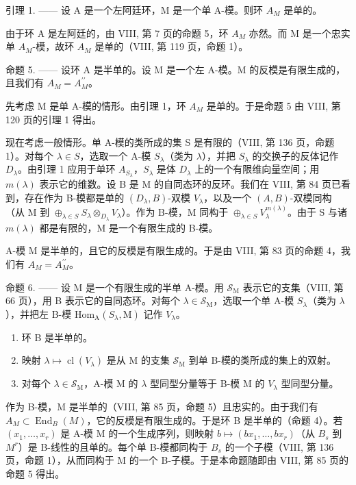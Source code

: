 引理 1. —— 设 A 是一个左阿廷环，M 是一个单 A-模。则环 \(A_{M}\) 是单的。

由于环 A 是左阿廷的，由 VIII, 第 7 页的命题 5，环 \(A_{M}\) 亦然。而 M 是一个忠实单 \(A_{M}\)-模，故环 \(A_{M}\) 是单的（VIII, 第 119 页，命题 1）。

命题 5. —— 设环 A 是半单的。设 M 是一个左 A-模。M 的反模是有限生成的，且我们有 \(A_{M} = A_{M}^{\prime\prime}\)。

先考虑 M 是单 A-模的情形。由引理 1，环 \(A_{M}\) 是单的。于是命题 5 由 VIII, 第 120 页的引理 1 得出。

现在考虑一般情形。单 A-模的类所成的集 S 是有限的（VIII, 第 136 页，命题 1）。对每个 \(\lambda \in S\)，选取一个 A-模 \(S_{\lambda}\)（类为 \(\lambda\)），并把 \(S_{\lambda}\) 的交换子的反体记作 \(D_{\lambda}\)。由引理 1 应用于单环 \(A_{S_{\lambda}}\)，\(S_{\lambda}\) 是体 \(D_{\lambda}\) 上的一个有限维向量空间；用 \(m(\lambda)\) 表示它的维数。设 B 是 M 的自同态环的反环。我们在 VIII, 第 84 页已看到，存在作为 B-模都是单的 \((D_{\lambda}, B)\)-双模 \(V_{\lambda}\)，以及一个 \((A, B)\)-双模同构（从 M 到 \(\oplus_{\lambda \in S} S_{\lambda} \otimes_{D_{\lambda}} V_{\lambda}\)）。作为 B-模，M 同构于 \(\oplus_{\lambda \in S} V_{\lambda}^{m(\lambda)}\)。由于 S 与诸 \(m(\lambda)\) 都是有限的，M 是一个有限生成的 B-模。

A-模 M 是半单的，且它的反模是有限生成的。于是由 VIII, 第 83 页的命题 4，我们有 \(A_{M} = A_{M}^{\prime\prime}\)。

命题 6. —— 设 M 是一个有限生成的半单 A-模。用 \(\mathcal{S}_{\mathrm{M}}\) 表示它的支集（VIII, 第 66 页），用 B 表示它的自同态环。对每个 \(\lambda \in \mathcal{S}_{\mathrm{M}}\)，选取一个单 A-模 \(S_{\lambda}\)（类为 \(\lambda\)），并把左 B-模 \(\mathrm{Hom}_{\mathrm{A}}(S_{\lambda}, \mathrm{M})\) 记作 \(V_{\lambda}\)。

\begin{enumerate}
\def\labelenumi{\alph{enumi})}
\item
  环 B 是半单的。
\item
  映射 \(\lambda \mapsto \operatorname{cl}(V_{\lambda})\) 是从 M 的支集 \(\mathcal{S}_{\mathrm{M}}\) 到单 B-模的类所成的集上的双射。
\item
  对每个 \(\lambda \in \mathcal{S}_{\mathrm{M}}\)，A-模 M 的 \(\lambda\) 型同型分量等于 B-模 M 的 \(V_{\lambda}\) 型同型分量。
\end{enumerate}

作为 B-模，M 是半单的（VIII, 第 85 页，命题 5）且忠实的。由于我们有 \(A_{M} \subset \operatorname{End}_{B}(M)\)，它的反模是有限生成的。于是环 B 是半单的（命题 4）。若 \((x_{1}, \ldots, x_{r})\) 是 A-模 M 的一个生成序列，则映射 \(b \mapsto (bx_{1}, \ldots, bx_{r})\)（从 \(B_{s}\) 到 \(M^{r}\)）是 B-线性的且单的。每个单 B-模都同构于 \(B_{s}\) 的一个子模（VIII, 第 136 页，命题 1），从而同构于 M 的一个 B-子模。于是本命题随即由 VIII, 第 85 页的命题 5 得出。

